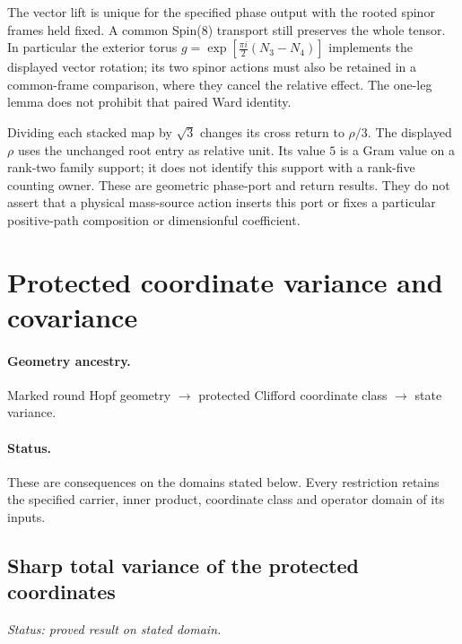 \documentclass[11pt]{article}
\begin{document}
\begin{remark}
\label{p1:rem:v242-phase-lift-scope}
The vector lift is unique for the specified phase output with the rooted
spinor frames held fixed. A common Spin(8) transport still preserves the
whole tensor. In particular the exterior torus
\(g=\exp[\frac{\pi i}{2}(N_3-N_4)]\) implements the displayed vector
rotation; its two spinor actions must also be retained in a common-frame
comparison, where they cancel the relative effect. The one-leg lemma
does not prohibit that paired Ward identity.

Dividing each stacked map by \(\sqrt3\) changes its cross return to
\(\rho/3\). The displayed \(\rho\) uses the unchanged root entry as
relative unit. Its value \(5\) is a Gram value on a rank-two family
support; it does not identify this support with a rank-five counting
owner. These are geometric phase-port and return results. They do not
assert that a physical mass-source action inserts this port or fixes a
particular positive-path composition or dimensionful coefficient.
\end{remark}




\setlength{\emergencystretch}{2em}
\section{Protected coordinate variance and covariance}
\label{p1:sec:v2201-geometry-first-consequences}
\paragraph{Geometry ancestry.}
Marked round Hopf geometry $\to$ protected Clifford coordinate class $\to$ state variance.
\paragraph{Status.}
These are consequences on the domains stated below.
Every restriction retains the specified carrier, inner product,
coordinate class and operator domain of its inputs.

\subsection{Sharp total variance of the protected coordinates}
\label{p1:sec:v2201-derived-d02}
\noindent\textit{Status: proved result on stated domain.}
\end{document}

